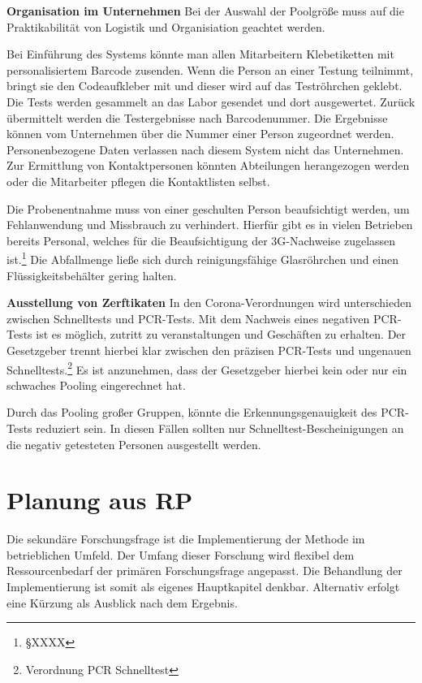 \cleardoublepage

\textbf{Organisation im Unternehmen}\newline
Bei der Auswahl der Poolgröße muss auf die Praktikabilität von Logistik und Organisiation geachtet werden.

Bei Einführung des Systems könnte man allen Mitarbeitern Klebetiketten mit personalisiertem Barcode zusenden.
Wenn die Person an einer Testung teilnimmt, bringt sie den Codeaufkleber mit und dieser wird auf das Teströhrchen geklebt.
Die Tests werden gesammelt an das Labor gesendet und dort ausgewertet.
Zurück übermittelt werden die Testergebnisse nach Barcodenummer.
Die Ergebnisse können vom Unternehmen über die Nummer einer Person zugeordnet werden.
Personenbezogene Daten verlassen nach diesem System nicht das Unternehmen.
Zur Ermittlung von Kontaktpersonen könnten Abteilungen herangezogen werden oder die Mitarbeiter pflegen die Kontaktlisten selbst.

Die Probenentnahme muss von einer geschulten Person beaufsichtigt werden, um Fehlanwendung und Missbrauch zu verhindert.
Hierfür gibt es in vielen Betrieben bereits Personal, welches für die Beaufsichtigung der 3G-Nachweise zugelassen ist.\footnote{§XXXX}
Die Abfallmenge ließe sich durch reinigungsfähige Glasröhrchen und einen Flüssigkeitsbehälter gering halten.

\textbf{Ausstellung von Zerftikaten}\newline
In den Corona-Verordnungen wird unterschieden zwischen Schnelltests und PCR-Tests.
Mit dem Nachweis eines negativen PCR-Tests ist es möglich, zutritt zu veranstaltungen und Geschäften zu erhalten.
Der Gesetzgeber trennt hierbei klar zwischen den präzisen PCR-Tests und ungenauen Schnelltests.\footnote{Verordnung PCR Schnelltest}
Es ist anzunehmen, dass der Gesetzgeber hierbei kein oder nur ein schwaches Pooling eingerechnet hat.

Durch das Pooling großer Gruppen, könnte die Erkennungsgenauigkeit des PCR-Tests reduziert sein.
In diesen Fällen sollten nur Schnelltest-Bescheinigungen an die negativ getesteten Personen ausgestellt werden.
\cleardoublepage




\section{Planung aus RP}
Die sekundäre Forschungsfrage ist die Implementierung der Methode im betrieblichen Umfeld.
Der Umfang dieser Forschung wird flexibel dem Ressourcenbedarf der primären Forschungsfrage angepasst.
Die Behandlung der Implementierung ist somit als eigenes Hauptkapitel denkbar.
Alternativ erfolgt eine Kürzung als Ausblick nach dem Ergebnis.

